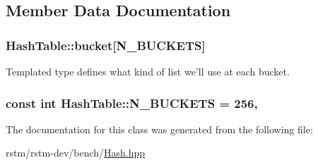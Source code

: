 \subsection{Member Data Documentation}
\hypertarget{classHashTable_a43d16ae8fc0f530758b5924a8ab7a9c6}{
\subsubsection[{bucket}]{ Hash\-Table\-::bucket\mbox{[}{\bf N\-\_\-\-B\-U\-C\-K\-E\-T\-S}\mbox{]}}}\label{classHashTable_a43d16ae8fc0f530758b5924a8ab7a9c6}
Templated type defines what kind of list we'll use at each bucket. \hypertarget{classHashTable_a61024c536f9eb01bb0327ba3ed5361cc}{
\subsubsection[{N\-\_\-\-B\-U\-C\-K\-E\-T\-S}]{\setlength{\rightskip}{0pt plus 5cm}const int Hash\-Table\-::\-N\-\_\-\-B\-U\-C\-K\-E\-T\-S = 256\hspace{0.3cm}{\ttfamily [static]}, {\ttfamily [private]}}}\label{classHashTable_a61024c536f9eb01bb0327ba3ed5361cc}


The documentation for this class was generated from the following file\-:\begin{DoxyCompactItemize}
\item 
rstm/rstm-\/dev/bench/\hyperlink{Hash_8hpp}{Hash.\-hpp}\end{DoxyCompactItemize}
